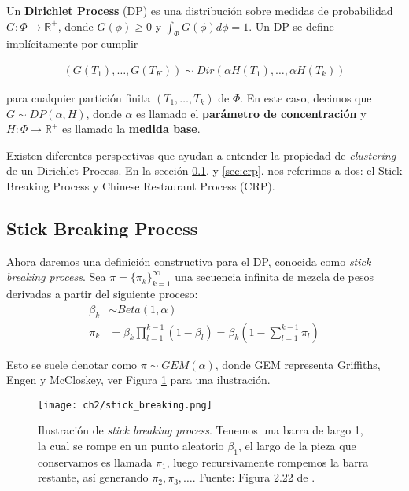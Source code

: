 \documentclass[letterpaper,12pt,oneside]{book} %
\begin{document}
Un \textbf{Dirichlet Process} (DP) es una distribución sobre medidas de probabilidad $G: \Phi \rightarrow \mathbb{R}^{+}$, donde $G(\phi)\geq 0$ y $\int_{\Phi}G(\phi)d\phi=1$. Un DP se define implícitamente por cumplir 

\begin{align}
    (G(T_{1}), \ldots, G(T_{K})) \sim Dir(\alpha H(T_{1}), \ldots, \alpha H(T_{k}))
\end{align}

para cualquier partición finita $(T_{1}, \ldots, T_{k})$ de $\Phi$. En este caso, decimos que $G\sim DP(\alpha, H)$, donde $\alpha$ es llamado el \textbf{parámetro de concentración} y $H: \Phi \rightarrow \mathbb{R}^{+}$ es llamado la \textbf{medida base}.

Existen diferentes perspectivas que ayudan a entender la propiedad de \textit{clustering} de un Dirichlet Process. En la sección \ref{sec:sbp}. y \ref{sec:crp}. nos referimos a dos: el Stick Breaking Process y Chinese Restaurant Process (CRP).

\subsection{Stick Breaking Process}
\label{sec:sbp}

Ahora daremos una definición constructiva para el DP, conocida como \textit{stick breaking process}. Sea $\pi=\{\pi_{k}\}_{k=1}^{\infty}$ una secuencia infinita de mezcla de pesos derivadas a partir del siguiente proceso:
\begin{align}
    \beta_{k} & \sim Beta(1, \alpha)\\
    \pi_{k} & = \beta_{k}\prod_{l=1}^{k-1}(1-\beta_{l}) = \beta_{k}(1-\sum_{l=1}^{k-1}\pi_{l})
\end{align}

Esto se suele denotar como $\pi \sim GEM(\alpha)$, donde GEM representa Griffiths, Engen y McCloskey, ver Figura  \ref{img:stick_breaking} para una ilustración. 

\begin{figure}
    \centering
    \texttt{[image: ch2/stick\_breaking.png]}
    \caption{Ilustración de \textit{stick breaking process}. Tenemos una barra de largo 1, la cual se rompe en un punto aleatorio $\beta_{1}$, el largo de la pieza que conservamos es llamada $\pi_{1}$, luego recursivamente rompemos la barra restante, así generando $\pi_{2}, \pi_{3}, \ldots$. Fuente: Figura 2.22 de \citep{sudderth2006graphical}.}
    \label{img:stick_breaking}
\end{figure}
\end{document}

